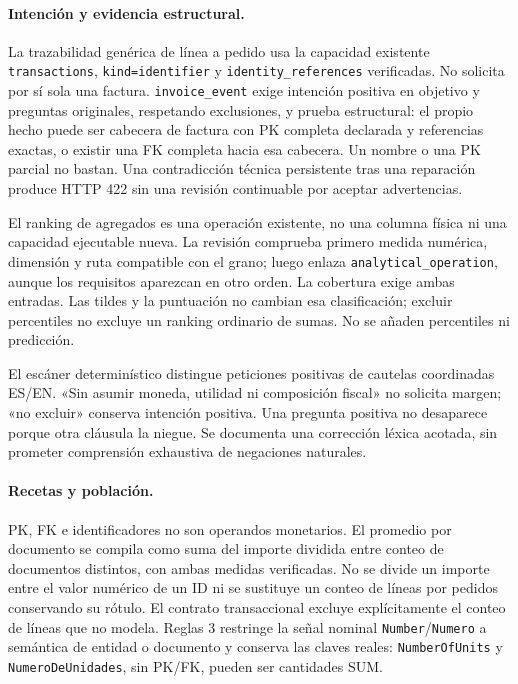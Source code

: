 \documentclass[11pt,letterpaper]{article}
\newcommand{\file}[1]{\texttt{#1}}
\begin{document}
\paragraph{Intención y evidencia estructural.}
La trazabilidad genérica de línea a pedido usa la capacidad existente
\file{transactions}, \file{kind=identifier} y \file{identity\_references} verificadas.
No solicita por sí sola una factura. \file{invoice\_event} exige intención positiva
en objetivo y preguntas originales, respetando exclusiones, y prueba estructural:
el propio hecho puede ser cabecera de factura con PK completa declarada y
referencias exactas, o existir una FK completa hacia esa cabecera. Un nombre o
una PK parcial no bastan. Una contradicción técnica persistente tras una reparación
produce HTTP 422 sin una revisión continuable por aceptar advertencias.

El ranking de agregados es una operación existente, no una columna física ni una
capacidad ejecutable nueva. La revisión comprueba primero medida numérica,
dimensión y ruta compatible con el grano; luego enlaza \file{analytical\_operation},
aunque los requisitos aparezcan en otro orden. La cobertura exige ambas entradas.
Las tildes y la puntuación no cambian esa clasificación; excluir percentiles no
excluye un ranking ordinario de sumas. No se añaden percentiles ni predicción.

El escáner determinístico distingue peticiones positivas de cautelas coordinadas
ES/EN. «Sin asumir moneda, utilidad ni composición fiscal» no solicita margen;
«no excluir» conserva intención positiva. Una pregunta positiva no desaparece
porque otra cláusula la niegue. Se documenta una corrección léxica acotada, sin
prometer comprensión exhaustiva de negaciones naturales.

\paragraph{Recetas y población.}
PK, FK e identificadores no son operandos monetarios. El promedio por documento
se compila como suma del importe dividida entre conteo de documentos distintos,
con ambas medidas verificadas. No se divide un importe entre el valor numérico
de un ID ni se sustituye un conteo de líneas por pedidos conservando su rótulo.
El contrato transaccional excluye explícitamente el conteo de líneas que no modela.
Reglas 3 restringe la señal nominal \file{Number}/\file{Numero} a semántica de
entidad o documento y conserva las claves reales: \file{NumberOfUnits} y
\file{NumeroDeUnidades}, sin PK/FK, pueden ser cantidades SUM.
\end{document}
